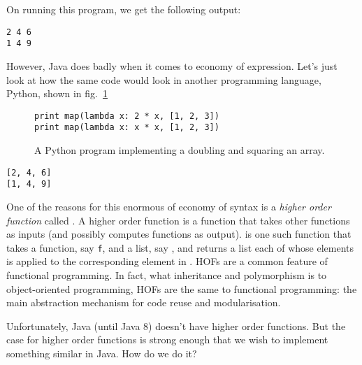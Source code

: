 \documentclass[12pt,a4paper]{article}
\begin{document}
On running this program, we get the following output:
\begin{lstlisting}[frame=single]
2 4 6 
1 4 9 
\end{lstlisting}

However, Java does badly when it comes to economy of expression. 
Let's just look at how the same code would look in another programming language, Python, shown in fig.~\ref{f:hof3}

\begin{figure}[H]
\begin{lstlisting}[frame=single]
print map(lambda x: 2 * x, [1, 2, 3])
print map(lambda x: x * x, [1, 2, 3])
\end{lstlisting}
\caption{A Python program implementing a doubling and squaring an array.}
\label{f:hof3}
\end{figure}

\begin{lstlisting}[frame=single]
[2, 4, 6]
[1, 4, 9]
\end{lstlisting}

One of the reasons for this enormous of economy of syntax is a \emph{higher order function} called \lstinline@map@. A higher order function is a function that takes other functions as inputs (and possibly computes functions as output). \lstinline@map@ is one such function that takes a function, say \lstinline$f$, and a list, say \lstinline@l@, and returns a list each of whose elements is \lstinline@f@ applied to the corresponding element in \lstinline@l@. HOFs are a common feature of functional programming. In fact, what inheritance and polymorphism is to object-oriented programming, HOFs are the same to functional programming: the main abstraction mechanism for code reuse and modularisation.

Unfortunately, Java (until Java 8) doesn't have higher order functions. But the case for higher order functions is strong enough that we wish to implement something similar in Java. How do we do it?
\end{document}
